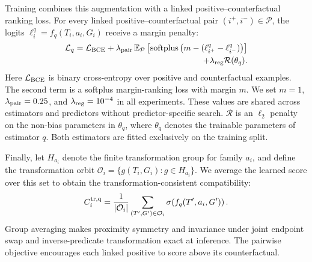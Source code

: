 Training combines this augmentation with a linked positive--counterfactual ranking loss. For every linked positive--counterfactual pair $(i^+,i^-)\in\mathcal P$, the logits $\ell_i^q=f_q(T_i,a_i,G_i)$ receive a margin penalty:
\begin{equation}
\begin{aligned}
\mathcal L_q=\mathcal L_{\rm BCE}
+\lambda_{\rm pair}\,\mathbb E_{\mathcal P}
\left[\operatorname{softplus}
\left(m-(\ell^q_{i^+}-\ell^q_{i^-})\right)\right] \\
+\lambda_{\rm reg}\mathcal R(\theta_q).
\end{aligned}
\end{equation}
Here $\mathcal L_{\rm BCE}$ is binary cross-entropy over positive and counterfactual examples. The second term is a softplus margin-ranking loss with margin $m$. We set $m=1$, $\lambda_{\rm pair}=0.25$, and $\lambda_{\rm reg}=10^{-4}$ in all experiments. These values are shared across estimators and predictors without predictor-specific search. $\mathcal R$ is an $\ell_2$ penalty on the non-bias parameters in $\theta_q$, where $\theta_q$ denotes the trainable parameters of estimator $q$. Both estimators are fitted exclusively on the training split.

Finally, let $H_{a_i}$ denote the finite transformation group for family $a_i$, and define the transformation orbit $\mathcal O_i=\{g(T_i,G_i):g\in H_{a_i}\}$. We average the learned score over this set to obtain the transformation-consistent compatibility:
\begin{equation}
C_i^{\rm tr,q}=\frac{1}{|\mathcal O_i|}
\sum_{(T',G')\in\mathcal O_i} \sigma\!\left(f_q(T',a_i,G')\right).
\label{eq:algebra-projection}
\end{equation}
Group averaging makes proximity symmetry and invariance under joint endpoint swap and inverse-predicate transformation exact at inference. The pairwise objective encourages each linked positive to score above its counterfactual.

